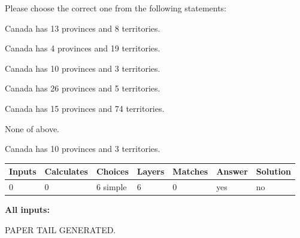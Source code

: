\documentclass[12pt]{article}
\begin{document}
  
Please choose the correct one from the following statements:
 
 
Canada has  13 provinces and  8 territories.
 
 
Canada has   4 provinces and  19 territories.
 
 
Canada has 10  provinces and 3 territories.
 
 
Canada has  26 provinces and  5 territories.
 
 
Canada has  15 provinces and  74 territories.
 
 
 None of above.
 
 
\noindent{}
 
 
Canada has 10  provinces and 3 territories.
 
 
\noindent{}
 
 
   
   
   
   
\noindent\begin{tabular}{|l|l|l|l|l|l|l|}
 \hline
Inputs & Calculates & Choices & Layers & Matches & Answer & Solution \\ \hline
 0  & 
 0  & 
 6
  simple  
  & 
 6  & 
 0  & 
  yes & 
  no 
  \\ \hline
 \end{tabular}
   
   
   
   
\noindent{}
   
   
   
   
\noindent\vspace{0.1in}\hspace{-0.08in} {\textbf{\Large{All inputs: }}}
   
   
   
   
   
   
 \vspace{0.2in}
 
   
   
\vspace{2.0in} PAPER TAIL GENERATED.
   
   
   
\end{document}
